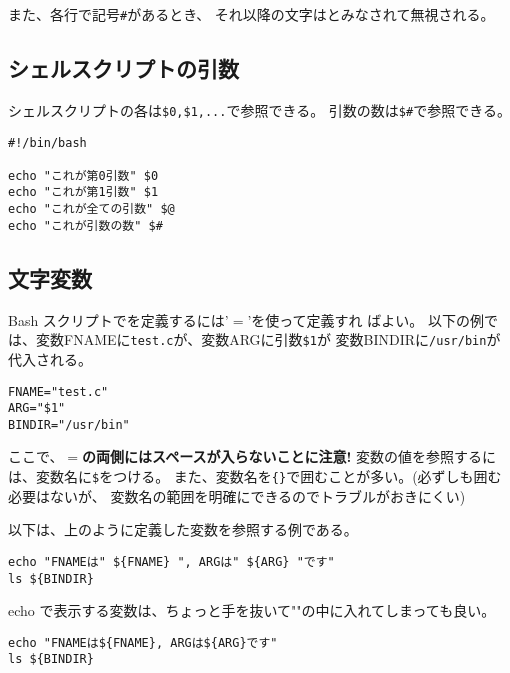 \documentclass{jreport}
\begin{document}
また、各行で記号\verb|#|があるとき、
それ以降の文字はとみなされて無視される。

\subsection{シェルスクリプトの引数}

\index{\$\#}
シェルスクリプトの各は\verb|$0,$1,...|で参照できる。
引数の数は\verb|$#|で参照できる。
\begin{screen}
\begin{verbatim}
#!/bin/bash

echo "これが第0引数" $0
echo "これが第1引数" $1
echo "これが全ての引数" $@ 
echo "これが引数の数" $# 
\end{verbatim}
\end{screen}

\subsection{文字変数}

Bash スクリプトでを定義するには'$=$'を使って定義すれ
ばよい。
以下の例では、変数FNAMEに\verb|test.c|が、変数ARGに引数\verb|$1|が
変数BINDIRに\verb|/usr/bin|が代入される。
\begin{screen}
\begin{verbatim}
FNAME="test.c"
ARG="$1"
BINDIR="/usr/bin"
\end{verbatim}
\end{screen}
ここで、\textbf{$=$の両側にはスペースが入らないことに注意!}
変数の値を参照するには、変数名に\verb|$|をつける。
また、変数名を\verb|{}|で囲むことが多い。(必ずしも囲む必要はないが、
変数名の範囲を明確にできるのでトラブルがおきにくい)

以下は、上のように定義した変数を参照する例である。
\begin{screen}
\begin{verbatim}
echo "FNAMEは" ${FNAME} ", ARGは" ${ARG} "です"
ls ${BINDIR}
\end{verbatim}
\end{screen}
echo で表示する変数は、ちょっと手を抜いて""の中に入れてしまっても良い。
\begin{screen}
\begin{verbatim}
echo "FNAMEは${FNAME}, ARGは${ARG}です"
ls ${BINDIR}
\end{verbatim}
\end{screen}
\end{document}
